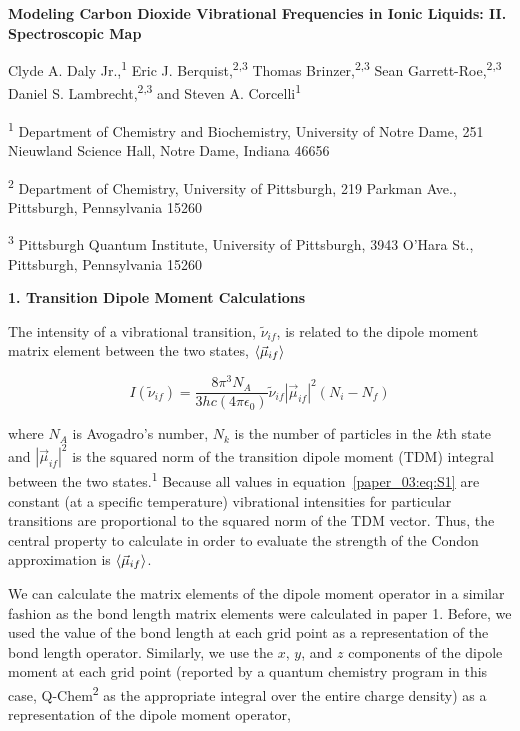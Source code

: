 \documentclass[]{article}
\date{}
\begin{document}
\textbf{Modeling Carbon Dioxide Vibrational Frequencies in Ionic Liquids: II. Spectroscopic Map}

Clyde A. Daly Jr.,\textsuperscript{1} Eric J.  Berquist,\textsuperscript{2,3} Thomas Brinzer,\textsuperscript{2,3} Sean Garrett-Roe,\textsuperscript{2,3} Daniel S.  Lambrecht,\textsuperscript{2,3} and Steven A.  Corcelli\textsuperscript{1}

\textsuperscript{1} Department of Chemistry and Biochemistry, University of Notre Dame, 251 Nieuwland Science Hall, Notre Dame, Indiana 46656

\textsuperscript{2} Department of Chemistry, University of Pittsburgh, 219 Parkman Ave., Pittsburgh, Pennsylvania 15260

\textsuperscript{3} Pittsburgh Quantum Institute, University of Pittsburgh, 3943 O'Hara St., Pittsburgh, Pennsylvania 15260

\textbf{1. Transition Dipole Moment Calculations}

The intensity of a vibrational transition, \(\tilde{\nu}_{if}\), is related to the dipole moment matrix element between the two states, \(\Braket{\vec{\mu}_{if}}\)

\begin{equation}
  \label{paper_03:eq:S1}
  I \left( \tilde{\nu}_{if} \right) = \frac{8\pi^{3}N_{A}}{3hc\left( 4\pi\epsilon_{0} \right)} \tilde{\nu}_{if} \left| \vec{\mu}_{if} \right|^{2} (N_{i} - N_{f})
\end{equation}

where \(N_{A}\) is Avogadro's number, \(N_{k}\) is the number of particles in the \(k\)th state and \(\left| \vec{\mu}_{if} \right|^{2}\) is the squared norm of the transition dipole moment (TDM) integral between the two states.\textsuperscript{1} Because all values in equation~\ref{paper_03:eq:S1} are constant (at a specific temperature) vibrational intensities for particular transitions are proportional to the squared norm of the TDM vector. Thus, the central property to calculate in order to evaluate the strength of the Condon approximation is \(\Braket{\vec{\mu}_{if}}\).

We can calculate the matrix elements of the dipole moment operator in a similar fashion as the bond length matrix elements were calculated in paper 1. Before, we used the value of the bond length at each grid point as a representation of the bond length operator. Similarly, we use the \(x\), \(y\), and \(z\) components of the dipole moment at each grid point (reported by a quantum chemistry program \textemdash{} in this case, Q-Chem\textsuperscript{2} \textemdash{} as the appropriate integral over the entire charge density) as a representation of the dipole moment operator,
\end{document}
